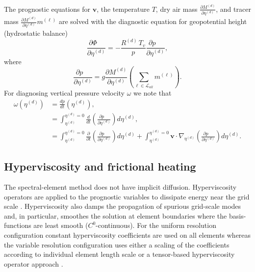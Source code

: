 \documentclass{agujournal}
\begin{document}
{The prognostic equations for $\mathbf{v}$, the temperature $T$, dry air mass ${\frac{\partial {M^{(d)}}}{\partial \eta^{(d)}}}$, and tracer mass ${\frac{\partial {M^{(d)}}}{\partial \eta^{(d)}}} m^{(\ell)}$ are solved with the diagnostic equation for geopotential height (hydrostatic balance)
\begin{equation}
\frac{\partial \Phi\quad }{\partial \eta^{(d)}}=-\frac{R^{(d)} \,T_v}{p}\frac{\partial p\quad }{\partial \eta^{(d)}},\label{eq:phi_1}
\end{equation}
where
\begin{equation}
\frac{\partial p\quad }{\partial \eta^{(d)}}=g\frac{\partial M^{(d)}}{\partial \eta^{(d)}}\left( \sum_{\ell \in \mathcal{L}_{all}} m^{(\ell)}\right).
\end{equation}
For diagnosing vertical pressure velocity $\omega$ we note that
\begin{align}
\omega(\eta^{(d)})&=\frac{dp}{dt}(\eta^{(d)}),\\
      &=\int_{\eta^{(d)}}^{\eta^{(d)}=0}\frac{d}{dt}\left( \frac{\partial p\quad }{\partial \eta^{(d)}}\right)d\eta^{(d)},\\
      &=\int_{\eta^{(d)}}^{\eta^{(d)}=0}\frac{\partial}{\partial t}\left( \frac{\partial p\quad }{\partial \eta^{(d)}}\right)d\eta^{(d)}+\int_{\eta^{(d)}}^{\eta^{(d)}=0} \mathbf{v}\cdot \nabla_{\eta^{(d)}} \left( \frac{\partial p\quad }{\partial \eta^{(d)}}\right)d\eta^{(d)}.\label{eq:omega}
\end{align}
%
\subsection{Hyperviscosity and frictional heating}\label{sec:hypvervisfric}
The spectral-element method does not have implicit diffusion. Hyperviscosity operators are applied to the prognostic variables to dissipate energy near the grid scale \citep{DetAl2012IJHPCA}. Hyperviscosity also damps the propagation of spurious grid-scale modes \citep{AW2009SIAM} and, in particular, smoothes the solution at element boundaries where the basis-functions are least smooth ($C^0$-continuous). For the uniform resolution configuration constant hyperviscosity coefficients are used on all elements whereas the variable resolution configuration uses either a scaling of the coefficients according to individual element length scale \citep{ZetAl2014JCb} or a tensor-based hyperviscosity operator approach \citep{GetAl2014GMD}.
}
\end{document}

